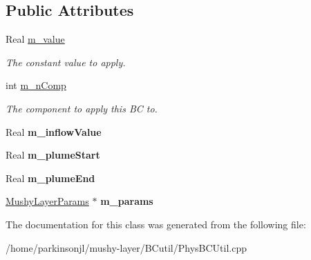 \subsection*{Public Attributes}
\begin{DoxyCompactItemize}
\item 
\hypertarget{class_pressure_inflow_value_function_a4ea988fb2567fad484acbdd1192f04c1}{Real \hyperlink{class_pressure_inflow_value_function_a4ea988fb2567fad484acbdd1192f04c1}{m\-\_\-value}}\label{class_pressure_inflow_value_function_a4ea988fb2567fad484acbdd1192f04c1}

\begin{DoxyCompactList}\small\item\em The constant value to apply. \end{DoxyCompactList}\item 
\hypertarget{class_pressure_inflow_value_function_a696bcf66ca28efa96314cb959dfb9f6a}{int \hyperlink{class_pressure_inflow_value_function_a696bcf66ca28efa96314cb959dfb9f6a}{m\-\_\-n\-Comp}}\label{class_pressure_inflow_value_function_a696bcf66ca28efa96314cb959dfb9f6a}

\begin{DoxyCompactList}\small\item\em The component to apply this B\-C to. \end{DoxyCompactList}\item 
\hypertarget{class_pressure_inflow_value_function_acb7b9ec6085a1b79ed4d7bf341185a32}{Real {\bfseries m\-\_\-inflow\-Value}}\label{class_pressure_inflow_value_function_acb7b9ec6085a1b79ed4d7bf341185a32}

\item 
\hypertarget{class_pressure_inflow_value_function_a14ffe6da33fc18c3394805b8934e9cfc}{Real {\bfseries m\-\_\-plume\-Start}}\label{class_pressure_inflow_value_function_a14ffe6da33fc18c3394805b8934e9cfc}

\item 
\hypertarget{class_pressure_inflow_value_function_ae342d40736d7519d777db87979f2b713}{Real {\bfseries m\-\_\-plume\-End}}\label{class_pressure_inflow_value_function_ae342d40736d7519d777db87979f2b713}

\item 
\hypertarget{class_pressure_inflow_value_function_a77a3ee87530c9cdc4b13a6373addb651}{\hyperlink{class_mushy_layer_params}{Mushy\-Layer\-Params} $\ast$ {\bfseries m\-\_\-params}}\label{class_pressure_inflow_value_function_a77a3ee87530c9cdc4b13a6373addb651}

\end{DoxyCompactItemize}


The documentation for this class was generated from the following file\-:\begin{DoxyCompactItemize}
\item 
/home/parkinsonjl/mushy-\/layer/\-B\-Cutil/Phys\-B\-C\-Util.\-cpp\end{DoxyCompactItemize}
